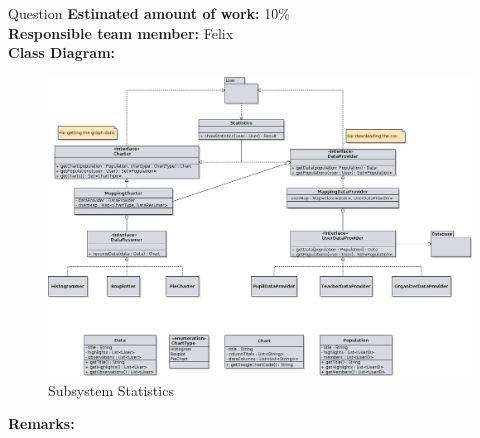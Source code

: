 \begin{subsection}{Question}
	\textbf{Estimated amount of work:} 10\% \\
	\textbf{Responsible team member:} Felix \\
	\textbf{Class Diagram:} \\
	
	\begin{figure}[!h]
	  \centering
		\includegraphics[width=1\textwidth]{../class_diagrams/statistics.png}
	  \caption{Subsystem Statistics}
	  \label{subsystem_question}
	\end{figure}
	
	\textbf{Remarks:} \\
	
\end{subsection}

